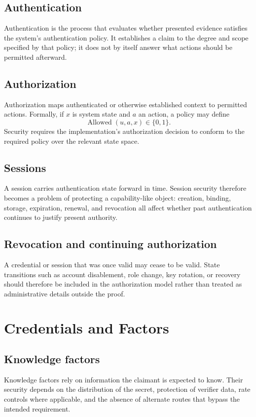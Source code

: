 \documentclass[11pt,oneside]{book}
\theoremstyle{definition}
\theoremstyle{remark}
\begin{document}
\section{Authentication}
Authentication is the process that evaluates whether presented evidence satisfies the system's authentication policy. It establishes a claim to the degree and scope specified by that policy; it does not by itself answer what actions should be permitted afterward.

\section{Authorization}
Authorization maps authenticated or otherwise established context to permitted actions. Formally, if $x$ is system state and $a$ an action, a policy may define
\[
\operatorname{Allowed}(u,a,x)\in\{0,1\}.
\]
Security requires the implementation's authorization decision to conform to the required policy over the relevant state space.

\section{Sessions}
A session carries authentication state forward in time. Session security therefore becomes a problem of protecting a capability-like object: creation, binding, storage, expiration, renewal, and revocation all affect whether past authentication continues to justify present authority.

\section{Revocation and continuing authorization}
A credential or session that was once valid may cease to be valid. State transitions such as account disablement, role change, key rotation, or recovery should therefore be included in the authorization model rather than treated as administrative details outside the proof.

\chapter{Credentials and Factors}
\label{ch:factors}
\section{Knowledge factors}
Knowledge factors rely on information the claimant is expected to know. Their security depends on the distribution of the secret, protection of verifier data, rate controls where applicable, and the absence of alternate routes that bypass the intended requirement.
\end{document}
